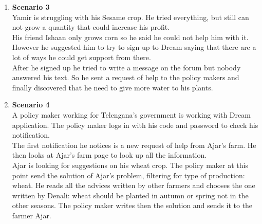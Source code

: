\begin{enumerate}
    
    \item \textbf{Scenario 3}\\
    Yamir is struggling with his Sesame crop. He tried everything, but still can not grow a quantity 
    that could increase his profit. \\
    His friend Ishaan only grows corn so he said he could not help him with it. However he suggested him to try to sign up to Dream 
    saying that there are a lot of ways he could get support from there. \\
    After he signed up he tried to write a message on the forum but nobody answered his text. 
    So he sent a request of help to the policy makers and finally discovered that he need to give more water to his plants.

    \item \textbf{Scenario 4}\\
    A policy maker working for Telengana's government is working with Dream application. The policy maker logs in with his code and password 
    to check his notification. \\
    The first notification he notices is a new request of help from Ajar's farm. He then looks at Ajar's farm page to look up all the information.\\
    Ajar is looking for suggestions on his wheat crop. The policy maker at this point send the solution of Ajar's problem, 
    filtering for type of production: wheat. 
    He reads all the advices written by other farmers and chooses the one written by Denali: wheat should be 
    planted in autumn or spring not in the other seasons. The policy maker writes then the solution and sends it to the farmer Ajar.

    
    
\end{enumerate}



